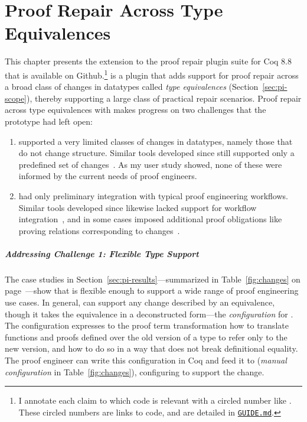 \chapter{Proof Repair Across Type Equivalences}
\label{chapt:pi}


This chapter presents the \toolnamec extension to the \sysnamelong proof repair plugin suite for Coq 8.8 %
that is available on Github.\footnote{I annotate each claim to which code is relevant with a circled number like . These circled numbers are links to code, and are detailed in \href{https://github.com/uwplse/pumpkin-pi/blob/v2.0.0/GUIDE.md}{\lstinline{GUIDE.md}}.} %
\toolnamec is a plugin that adds support for proof repair across a broad class of changes in datatypes called 
\textit{type equivalences} (Section~\ref{sec:pi-scope}),
thereby supporting a large class of practical repair scenarios.
Proof repair across type equivalences with \toolnamec makes progress on two challenges that the \sysname prototype had left open:

\begin{enumerate}
\item \sysname supported a very limited classes of changes in datatypes, namely those that do not change structure.
Similar tools developed since still supported only a predefined set of changes~\cite{robert2018, wibergh2019}. As my user study showed, none of these were informed by the current needs of proof engineers. %
\item \sysname had only preliminary integration with typical proof engineering workflows.
Similar tools developed since likewise lacked support for workflow integration~\cite{PGL-045, robert2018},
and in some cases imposed additional proof obligations like proving relations corresponding to changes~\cite{tabareau2019marriage}.
\end{enumerate}

\paragraph{Addressing Challenge 1: Flexible Type Support}
The case studies in Section~\ref{sec:pi-results}---summarized in Table~\ref{fig:changes} on page~\pageref{fig:changes}---show that \toolnamec is flexible enough to support
a wide range of proof engineering use cases. %
In general, \toolnamec can support any change described by an equivalence, though it takes the equivalence in a
deconstructed form---the \textit{configuration} for \toolnamec. %
The configuration expresses to the proof term transformation how to translate functions and proofs defined over the old version of a type
to refer only to the new version, and how to do so in a way that does not break definitional equality.
The proof engineer can write this configuration in Coq and feed it to \toolname (\textit{manual configuration} in Table~\ref{fig:changes}),
configuring \toolname to support the change. %

